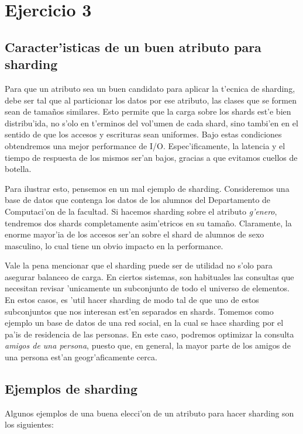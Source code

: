\section{Ejercicio 3}

\subsection{Caracter'isticas de un buen atributo para sharding}

Para que un atributo sea un buen candidato para aplicar la t'ecnica de sharding, debe ser tal que al particionar los datos por ese atributo, las clases que se formen sean de tama\~nos similares. Esto permite que la carga sobre los shards est'e bien distribu'ida, no s'olo en t'erminos del vol'umen de cada shard, sino tambi'en en el sentido de que los accesos y escrituras sean uniformes. Bajo estas condiciones obtendremos una mejor performance de I/O. Espec'ificamente, la latencia y el tiempo de respuesta de los mismos ser'an bajos, gracias a que evitamos cuellos de botella.

Para ilustrar esto, pensemos en un mal ejemplo de sharding. Consideremos una base de datos que contenga los datos de los alumnos del Departamento de Computaci'on de la facultad. Si hacemos sharding sobre el atributo \emph{g'enero}, tendremos dos shards completamente asim'etricos en su tama\~no. Claramente, la enorme mayor'ia de los accesos ser'an sobre el shard de alumnos de sexo masculino, lo cual tiene un obvio impacto en la performance.

Vale la pena mencionar que el sharding puede ser de utilidad no s'olo para asegurar balanceo de carga. En ciertos sistemas, son habituales las consultas que necesitan revisar 'unicamente un subconjunto de todo el universo de elementos. En estos casos, es 'util hacer sharding de modo tal de que uno de estos subconjuntos que nos interesan est'en separados en shards. Tomemos como ejemplo un base de datos de una red social, en la cual se hace sharding por el pa'is de residencia de las personas. En este caso, podremos optimizar la consulta \textit{amigos de una persona}, puesto que, en general, la mayor parte de los amigos de una persona est'an geogr'aficamente cerca.

\subsection{Ejemplos de sharding}

Algunos ejemplos de una buena elecci'on de un atributo para hacer sharding son los siguientes:

